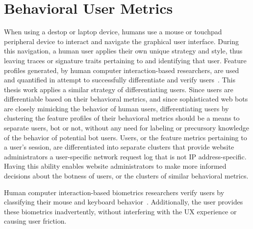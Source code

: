 
\section{Behavioral User Metrics}\label{sec:behavrioral-user-metrics}
When using a destop or laptop device, humans use a mouse or touchpad peripheral device to interact and navigate the graphical user interface.
During this navigation, a human user applies their own unique strategy and style, thus leaving traces or signature traits pertaining to and identifying that user.
Feature profiles generated, by human computer interaction-based researchers, are used and quantified in attempt to successfully differentiate and verify users~\cite{human_computer_interaction_based_intrusion_detection}.
This thesis work applies a similar strategy of differentiating users.
Since users are differentiable based on their behavioral metrics, and since sophisticated web bots are closely mimicking the behavior of human users, differentiating users by clustering the feature profiles of their behavioral metrics should be a means to separate users, bot or not, without any need for labeling or precursory knowledge of the behavior of potential bot users.
Users, or the feature metrics pertaining to a user's session, are differentiated into separate clusters that provide website administrators a user-specific network request log that is not IP address-specific.
Having this ability enables website administrators to make more informed decisions about the botness of users, or the clusters of similar behavioral metrics.

Human computer interaction-based biometrics researchers verify users by classifying their mouse and keyboard behavior~\cite{human_computer_interaction_based_intrusion_detection}.
Additionally, the user provides these biometrics inadvertently, without interfering with the UX experience or causing user friction.

